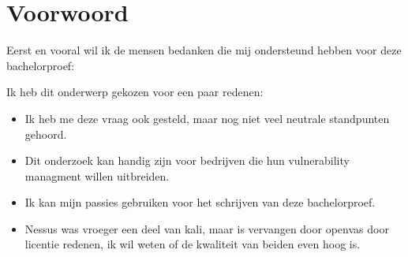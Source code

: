 
\chapter*{Voorwoord}
\label{ch:voorwoord}


Eerst en vooral wil ik de mensen bedanken die mij ondersteund hebben voor deze bachelorproef: 



Ik heb dit onderwerp gekozen voor een paar redenen: 
\begin{itemize}
\item Ik heb me deze vraag ook gesteld, maar nog niet veel neutrale standpunten gehoord.
\item Dit onderzoek kan handig zijn voor bedrijven die hun vulnerability managment willen uitbreiden.
\item Ik kan mijn passies gebruiken voor het schrijven van deze bachelorproef.
\item Nessus was vroeger een deel van kali, maar is vervangen door openvas door licentie redenen, ik wil weten of de kwaliteit van beiden even hoog is.
\end{itemize}

